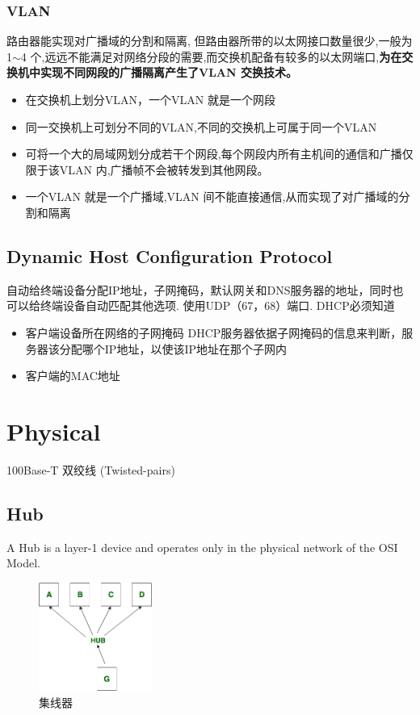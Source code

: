 \documentclass[a4paper]{report}
\begin{document}
\subsection{VLAN}
路由器能实现对广播域的分割和隔离, 但路由器所带的以太网接口数量很少,一般为1$\sim$4 个,远远不能满足对网络分段的需要,而交换机配备有较多的以太网端口,\textbf{为在交换机中实现不同网段的广播隔离产生了VLAN 交换技术。 }
\begin{itemize}
  \item 在交换机上划分VLAN，一个VLAN 就是一个网段
  \item 同一交换机上可划分不同的VLAN,不同的交换机上可属于同一个VLAN
  \item 可将一个大的局域网划分成若干个网段,每个网段内所有主机间的通信和广播仅限于该VLAN 内,广播帧不会被转发到其他网段。
  \item 一个VLAN 就是一个广播域,VLAN 间不能直接通信,从而实现了对广播域的分割和隔离
\end{itemize}
\section{Dynamic Host Configuration Protocol}
自动给终端设备分配IP地址，子网掩码，默认网关和DNS服务器的地址，同时也可以给终端设备自动匹配其他选项. 使用UDP（67，68）端口. DHCP必须知道
\begin{itemize}
  \item 客户端设备所在网络的子网掩码
  \subitem DHCP服务器依据子网掩码的信息来判断，服务器该分配哪个IP地址，以使该IP地址在那个子网内
  \item 客户端的MAC地址
\end{itemize}

\chapter{Physical}
100Base-T 双绞线 (Twisted-pairs)

\section{Hub}
A Hub is a layer-1 device and operates only in the physical network of the OSI Model. 

\begin{figure}[H]
\centering
\includegraphics[width=0.33\textwidth]{hub.png}
\caption{集线器}
\end{figure}
\end{document}
